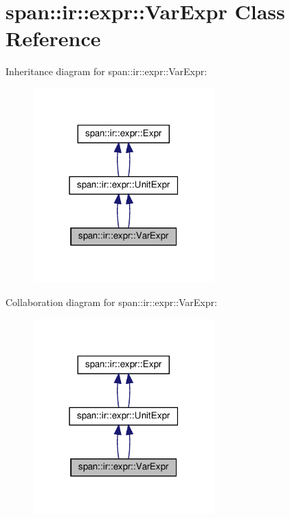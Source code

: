 \hypertarget{classspan_1_1ir_1_1expr_1_1VarExpr}{}\section{span\+:\+:ir\+:\+:expr\+:\+:Var\+Expr Class Reference}
\label{classspan_1_1ir_1_1expr_1_1VarExpr}


Inheritance diagram for span\+:\+:ir\+:\+:expr\+:\+:Var\+Expr\+:\nopagebreak
\begin{figure}[H]
\begin{center}
\leavevmode
\includegraphics[width=198pt]{classspan_1_1ir_1_1expr_1_1VarExpr__inherit__graph}
\end{center}
\end{figure}


Collaboration diagram for span\+:\+:ir\+:\+:expr\+:\+:Var\+Expr\+:\nopagebreak
\begin{figure}[H]
\begin{center}
\leavevmode
\includegraphics[width=198pt]{classspan_1_1ir_1_1expr_1_1VarExpr__coll__graph}
\end{center}
\end{figure}
